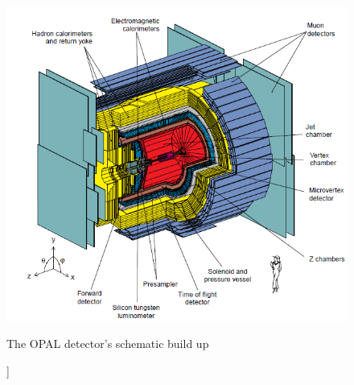 \begin{figure}[ht]
\centering
\includegraphics[width=1.0\linewidth]{graphics/OPALaufbau}
\caption[[Opal schematic build up]]{The OPAL detector's schematic build up}
\label{fig:OPALaufbau}
\end{figure}

